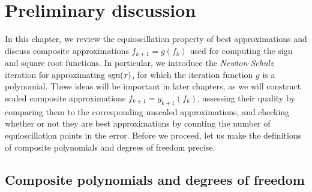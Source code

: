 \chapter{Preliminary discussion}
\label{chap:prelim}

In this chapter, we review the equioscillation property of best approximations and discuss composite approximations $f_{k+1}=g(f_k)$ used for computing the sign and square root functions. In particular, we introduce the \textit{Newton-Schulz} iteration for approximating $\text{sgn}(x)$, for which the iteration function $g$ is a polynomial. These ideas will be important in later chapters, as we will construct scaled composite approximations $f_{k+1}=g_{k+1}(f_k)$, assessing their quality by comparing them to the corresponding unscaled approximations, and checking whether or not they are best approximations by counting the number of equioscillation points in the error. Before we proceed, let us make the definitions of composite polynomials and degrees of freedom precise.

\section{Composite polynomials and degrees of freedom}





